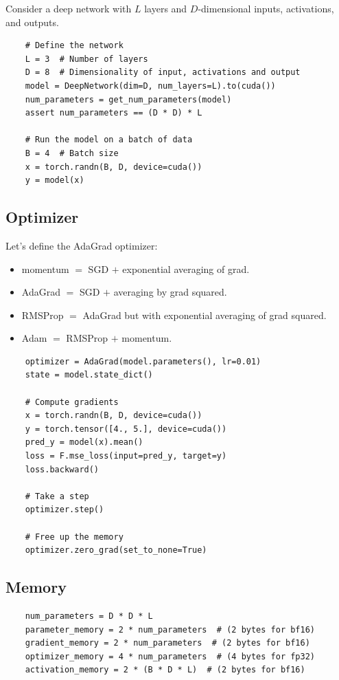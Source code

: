 \documentclass[12pt,twoside]{article}
\begin{document}
Consider a deep network with \(L\) layers and \(D\)-dimensional inputs, activations, and outputs.

\begin{verbatim}
    # Define the network
    L = 3  # Number of layers
    D = 8  # Dimensionality of input, activations and output
    model = DeepNetwork(dim=D, num_layers=L).to(cuda())
    num_parameters = get_num_parameters(model)  
    assert num_parameters == (D * D) * L
    
    # Run the model on a batch of data
    B = 4  # Batch size
    x = torch.randn(B, D, device=cuda())  
    y = model(x)  
\end{verbatim}

\subsection*{Optimizer}

Let's define the AdaGrad optimizer:

\begin{itemize}
    \item momentum \(=\) SGD \(+\) exponential averaging of grad.
    \item AdaGrad \(=\) SGD \(+\) averaging by grad squared.
    \item RMSProp \(=\) AdaGrad but with exponential averaging of grad squared.
    \item Adam \(=\) RMSProp \(+\) momentum.
\end{itemize}

\begin{verbatim}
    optimizer = AdaGrad(model.parameters(), lr=0.01)  
    state = model.state_dict()
    
    # Compute gradients
    x = torch.randn(B, D, device=cuda())
    y = torch.tensor([4., 5.], device=cuda())
    pred_y = model(x).mean()  
    loss = F.mse_loss(input=pred_y, target=y)
    loss.backward()
    
    # Take a step
    optimizer.step()

    # Free up the memory
    optimizer.zero_grad(set_to_none=True)
\end{verbatim}

\subsection*{Memory}

\begin{verbatim}
    num_parameters = D * D * L
    parameter_memory = 2 * num_parameters  # (2 bytes for bf16) 
    gradient_memory = 2 * num_parameters  # (2 bytes for bf16) 
    optimizer_memory = 4 * num_parameters  # (4 bytes for fp32) 
    activation_memory = 2 * (B * D * L)  # (2 bytes for bf16) 
\end{verbatim}
\end{document}
